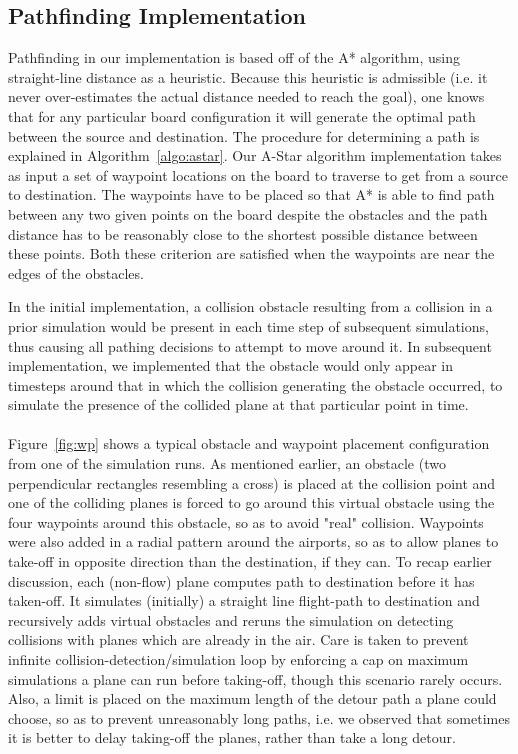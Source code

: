 \documentclass[10pt]{article}
\begin{document}
\subsection{Pathfinding Implementation}
Pathfinding in our implementation is based off of the A* algorithm, using
straight-line distance as a heuristic. Because this heuristic is admissible
(i.e. it never over-estimates the actual distance needed to reach the goal), one
knows that for any particular board configuration it will generate the optimal
path between the source and destination. The procedure for determining a path is
explained in Algorithm~\ref{algo:astar}. Our A-Star algorithm implementation
takes as input a set of waypoint locations on the board to traverse to get from
a source to destination.  The waypoints have to be placed so that A* is able to
find path between any two given points on the board despite the obstacles and
the path distance has to be reasonably close to the shortest possible distance
between these points.  Both these criterion are satisfied when the waypoints are
near the edges of the obstacles. 

In the initial implementation, a collision obstacle resulting from a collision
in a prior simulation would be present in each time step of subsequent
simulations, thus causing all pathing decisions to attempt to move around it. In
subsequent implementation, we implemented that the obstacle would only appear in
timesteps around that in which the collision generating the obstacle occurred,
to simulate the presence of the collided plane at that particular point in
time.\\\\

Figure~\ref{fig:wp} shows a typical obstacle and waypoint placement
configuration from one of the simulation runs. As mentioned earlier, an obstacle
(two perpendicular rectangles resembling a cross) is placed at the collision
point and one of the colliding planes is forced to go around this virtual
obstacle using the four waypoints around this obstacle, so as to avoid "real"
collision. Waypoints were also added in a radial pattern around the airports, so
as to allow planes to take-off in opposite direction than the destination, if
they can. To recap earlier discussion, each (non-flow) plane computes path to
destination before it has taken-off. It simulates (initially) a straight line
flight-path to destination and recursively adds virtual obstacles and reruns the
simulation on detecting collisions with planes which are already in the air.
Care is taken to prevent infinite collision-detection/simulation loop by
enforcing a cap on maximum simulations a plane can run before taking-off, though
this scenario rarely occurs. Also, a limit is placed on the maximum length of
the detour path a plane could choose, so as to prevent unreasonably long paths,
i.e. we observed that sometimes it is better to delay taking-off the planes,
rather than take a long detour.
\end{document}
